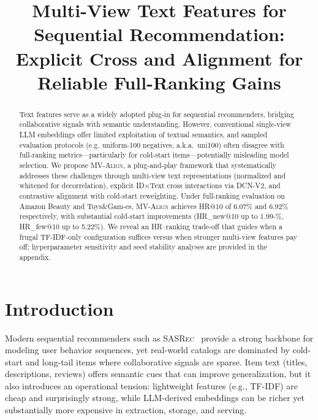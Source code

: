 \documentclass[sigconf,natbib=true]{acmart}
\newcommand{\model}{\textsc{MV-Align}\xspace}
\newcommand{\base}{\textsc{SASRec}\xspace}
\newcommand{\tfidf}{\textsc{TF-IDF}\xspace}
\newcommand{\llm}{\textsc{LLM}\xspace}
\begin{document}
\title{Multi-View Text Features for Sequential Recommendation:\\
Explicit Cross and Alignment for Reliable Full-Ranking Gains}


\begin{abstract}
Text features serve as a widely adopted plug-in for sequential recommenders, bridging collaborative signals with semantic understanding.
%
However, conventional single-view \llm embeddings offer limited exploitation of textual semantics, and sampled evaluation protocols (e.g. uniform-100 negatives, a.k.a.\ uni100) often disagree with full-ranking metrics---particularly for cold-start items---potentially misleading model selection.
%
We propose \model, a plug-and-play framework that systematically addresses these challenges through multi-view text representations (normalized and whitened for decorrelation), explicit ID$\times$Text cross interactions via DCN-V2, and contrastive alignment with cold-start reweighting.
%
Under full-ranking evaluation on Amazon Beauty and Toys\&Gam-es, \model achieves HR@10 of 6.07\% and 6.92\% respectively, with substantial cold-start improvements (HR\_new@10 up to 1.99-\%, HR\_few@10 up to 5.22\%).
%
We reveal an HR--ranking trade-off that guides when a frugal \tfidf-only configuration suffices versus when stronger multi-view features pay off; hyperparameter sensitivity and seed stability analyses are provided in the appendix.
\end{abstract}


\maketitle

\section{Introduction}

Modern sequential recommenders such as \base~\cite{kang2018sasrec}
provide a strong backbone for modeling user behavior sequences,
yet real-world catalogs are dominated by cold-start and long-tail
items where collaborative signals are sparse. Item text (titles,
descriptions, reviews) offers semantic cues that can improve
generalization, but it also introduces an operational tension:
lightweight features (e.g., \tfidf) are cheap and surprisingly
strong, while \llm-derived embeddings can be richer yet
substantially more expensive in extraction, storage, and serving.
\end{document}
